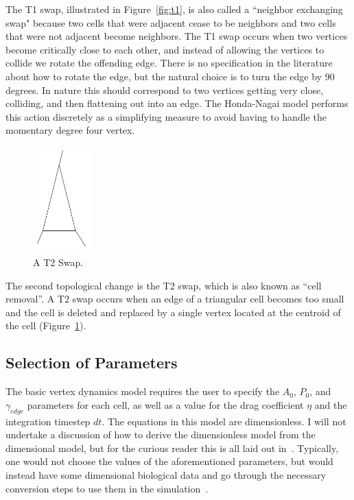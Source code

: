  The T1 swap, illustrated in Figure~\ref{fig:t1}, is also called a ``neighbor exchanging swap" because two cells that were adjacent cease to be neighbors and two cells that were not adjacent become neighbors. The T1 swap occurs when two vertices become critically close to each other, and instead of allowing the vertices to collide we rotate the offending edge. There is no specification in the literature about how to rotate the edge, but the natural choice is to turn the edge by 90 degrees. In nature this should correspond to two vertices getting very close, colliding, and then flattening out into an edge. The Honda-Nagai model performs this action discretely as a simplifying measure to avoid having to handle the momentary degree four vertex.


\begin{figure}
\centering
\includegraphics[width=0.2\textwidth, keepaspectratio]{../diagrams/t2.png}
\caption[A T2 Swap]{A T2 Swap.}
\label{fig:t2}
\end{figure}

The second topological change is the T2 swap, which is also known as ``cell removal''. A T2 swap occurs when an edge of a triangular cell becomes too small and the cell is deleted and replaced by a single vertex located at the centroid of the cell (Figure~\ref{fig:t2}).

\subsection{Selection of Parameters}
The basic vertex dynamics model requires the user to specify the $A_0$, $P_0$, and $\gamma_{edge}$ parameters for each cell, as well as a value for the drag coefficient $\eta$ and the integration timestep $dt$. The equations in this model are dimensionless. I will not undertake a discussion of how to derive the dimensionless model from the dimensional model, but for the curious reader this is all laid out in~\cite{HondaNagai}. Typically, one would not choose the values of the aforementioned parameters, but would instead have some dimensional biological data and go through the necessary conversion steps to use them in the simulation~\cite{NewOkuda}.

